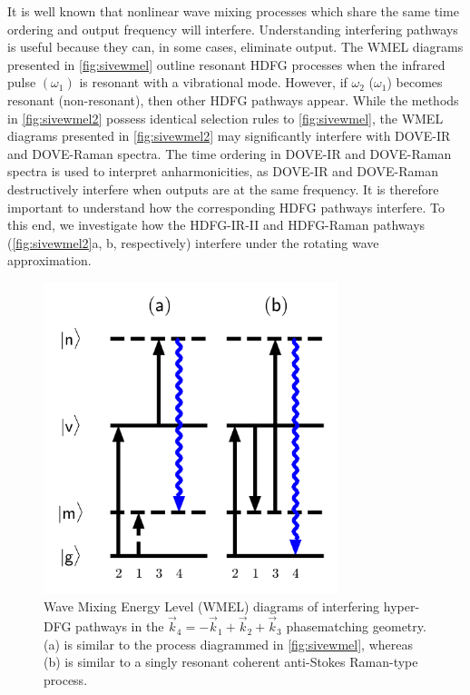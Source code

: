 \documentclass[aip, jcp, reprint, onecolumn]{revtex4-2}
\begin{document}
It is well known that nonlinear wave mixing processes which share the same time ordering and output frequency will interfere. \cite{RN135, Bonn2024}
Understanding interfering pathways is useful because they can, in some cases, eliminate output. \cite{RN342, RN135}
The WMEL diagrams presented in \autoref{fig:sivewmel} outline resonant HDFG processes when the infrared pulse $(\omega_1)$ is resonant with a vibrational mode. 
However, if $\omega_2$ ($\omega_1$) becomes resonant (non-resonant), then other HDFG pathways appear.\cite{McDonnell2024} 
While the methods in \autoref{fig:sivewmel2} possess identical selection rules to \autoref{fig:sivewmel}, the WMEL diagrams presented in \autoref{fig:sivewmel2} may significantly interfere with DOVE-IR and DOVE-Raman spectra.
The time ordering in DOVE-IR and DOVE-Raman spectra is used to interpret anharmonicities, as DOVE-IR and DOVE-Raman destructively interfere when outputs are at the same frequency. \cite{RN135, RN324}
It is therefore important to understand how the corresponding HDFG pathways interfere.
To this end, we investigate how the HDFG-IR-II and HDFG-Raman pathways (\autoref{fig:sivewmel2}a, b, respectively) interfere under the rotating wave approximation. 

\begin{figure}[!htbp]
	\centering
	\includegraphics[width=3.375in]{figures/wmel2.png}
	\caption{Wave Mixing Energy Level (WMEL) diagrams of interfering hyper-DFG pathways in the  $\vec{k}_4 = -\vec{k}_1 + \vec{k}_2 + \vec{k}_3$ phasematching geometry. 
		(a) is similar to the process diagrammed in \autoref{fig:sivewmel}, whereas (b) is similar to a singly resonant coherent anti-Stokes Raman-type process.
		}
	\label{fig:sivewmel2}
\end{figure}
\end{document}
